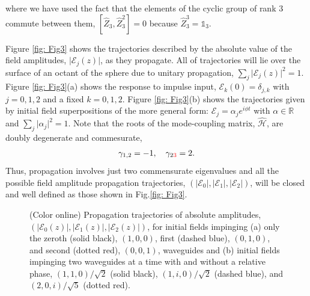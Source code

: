 \documentclass[9pt,twocolumn,twoside]{osajnl}
\begin{document}
where we have used the fact that the elements of the cyclic group of rank $3$ commute between them, $\left[ \hat{Z}_{3} , \hat{Z}_{3}^{2} \right] = 0$ because $\hat{Z}_{3}^{3} = \mathbb{1}_{3}$.  

Figure \ref{fig: Fig3} shows the trajectories described by the absolute value of the field amplitudes, $\vert \mathcal{E}_{j}(z)\vert$, as they propagate. 
All of trajectories will lie over the surface of an octant of the sphere due to unitary propagation, $\sum_{j} \vert \mathcal{E}_{j}(z) \vert^2 =1$.
Figure \ref{fig: Fig3}(a) shows the response to impulse input, $ \mathcal{E}_{k}(0)  = \delta_{j,k}$ with $j=0,1,2$ and a fixed $k=0,1,2$. 
Figure \ref{fig: Fig3}(b) shows the trajectories given by initial field superpositions of the more general form: $\mathcal{E}_{j} = \alpha_{j} e^{i \phi t}$ with $\alpha \in \mathbb{R}$ and $\sum_{j} \vert \alpha_{j} \vert^{2} =1$.
Note that the roots of the mode-coupling matrix, $\hat{\mathcal{H}}$, are doubly degenerate and commesurate, 
\begin{eqnarray}
\gamma_{1,2} = -1, \quad \gamma_{2\textcolor{red}{3}} = 2.
\end{eqnarray}
Thus, propagation involves just two commensurate eigenvalues and all the possible field amplitude propagation trajectories, $\left( \vert \mathcal{E}_{0} \vert, \vert \mathcal{E}_{1} \vert, \vert \mathcal{E}_{2} \vert  \right)$, will be closed and well defined as those shown in Fig.\ref{fig: Fig3}.


\begin{figure}[htbp]
\centering
{}
\caption{(Color online) Propagation trajectories of absolute amplitudes, $(\vert \mathcal{E}_{0}(z) \vert, \vert \mathcal{E}_{1}(z) \vert, \vert \mathcal{E}_{2}(z) \vert )$, for initial fields impinging (a) only the zeroth (solid black), $(1,0,0)$, first (dashed blue), $(0,1,0)$, and second (dotted red), $(0,0,1)$, waveguides and (b) initial fields impinging two waveguides at a time with and without a relative phase, $(1,1,0)/ \sqrt{2}$ (solid black), $(1,i,0)/\sqrt{2}$ (dashed blue), and $(2,0,i)/\sqrt{5}$ (dotted red).}
\label{fig: Fig4}
\end{figure}
\end{document}
